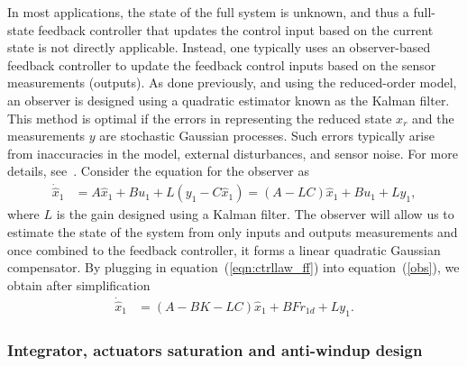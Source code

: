\documentclass[12pt]{iopart}
\begin{document}
In most applications, the state of the full system is unknown, and thus a full-state feedback controller that updates the control input based on the current state is not directly applicable. Instead, one typically uses an observer-based feedback controller to update the feedback control inputs based on the sensor measurements (outputs).
As done previously, and using the reduced-order model, an observer is designed using a quadratic estimator known as the Kalman filter. This method is optimal if the errors in representing the reduced state $x_r$ and the measurements $y$ are stochastic Gaussian processes. 
Such errors typically arise from inaccuracies in the model, external disturbances, and sensor noise. For more details, see~\cite{SandP, AandM, Stengel}. 
Consider the equation for the observer as
\begin{eqnarray}
 \dot{\hat{x}}_1 &=  A \hat{x}_1 + B u_{1} + L (y_1 - C \hat{x}_1) =   (A- L C) \hat{x}_1 + B u_{1} + L y_1,
 \label{obs}
\end{eqnarray}
 where $L$ is the gain designed using a Kalman filter.      
The observer will allow us to estimate the state of the system from only inputs and outputs measurements and once combined to the feedback controller, it forms a linear quadratic Gaussian compensator.
By plugging in equation~(\ref{eqn:ctrllaw_ff}) into equation~(\ref{obs}), we obtain after simplification
\begin{eqnarray}
      \dot{\hat{x}}_1 &=  (A- B K  -L C) \hat{x}_1 + B F r_{1d} + L y_1.
\end{eqnarray}


\subsubsection{Integrator, actuators saturation and anti-windup design} 
\end{document}
